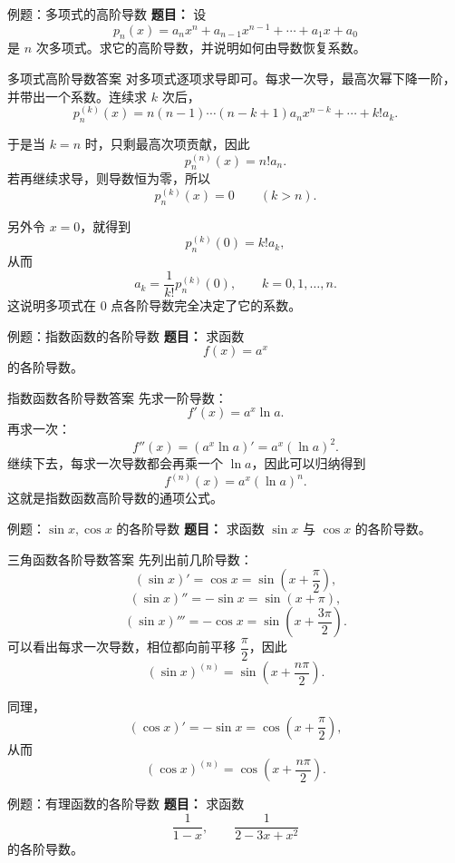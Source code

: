 ﻿\documentclass[aspectratio=169,11pt]{ctexbeamer}
\begin{document}
\begin{frame}{例题：多项式的高阶导数}
\small
\textbf{题目：} 设
\[
p_n(x)=a_nx^n+a_{n-1}x^{n-1}+\cdots+a_1x+a_0
\]
是 $n$ 次多项式。求它的高阶导数，并说明如何由导数恢复系数。
\end{frame}

\begin{frame}{多项式高阶导数答案}
\small
对多项式逐项求导即可。每求一次导，最高次幂下降一阶，并带出一个系数。连续求 $k$ 次后，
\[
p_n^{(k)}(x)
=n(n-1)\cdots(n-k+1)a_nx^{n-k}+\cdots+k!a_k.
\]

于是当 $k=n$ 时，只剩最高次项贡献，因此
\[
p_n^{(n)}(x)=n!a_n.
\]
若再继续求导，则导数恒为零，所以
\[
p_n^{(k)}(x)=0\qquad (k>n).
\]

另外令 $x=0$，就得到
\[
p_n^{(k)}(0)=k!a_k,
\]
从而
\[
a_k=\frac1{k!}p_n^{(k)}(0),\qquad k=0,1,\dots,n.
\]
这说明多项式在 $0$ 点各阶导数完全决定了它的系数。
\end{frame}

\begin{frame}{例题：指数函数的各阶导数}
\small
\textbf{题目：} 求函数
\[
f(x)=a^x
\]
的各阶导数。
\end{frame}

\begin{frame}{指数函数各阶导数答案}
\small
先求一阶导数：
\[
f'(x)=a^x\ln a.
\]
再求一次：
\[
f''(x)=(a^x\ln a)'=a^x(\ln a)^2.
\]
继续下去，每求一次导数都会再乘一个 $\ln a$，因此可以归纳得到
\[
f^{(n)}(x)=a^x(\ln a)^n.
\]
这就是指数函数高阶导数的通项公式。
\end{frame}

\begin{frame}{例题：$\sin x,\cos x$ 的各阶导数}
\small
\textbf{题目：} 求函数 $\sin x$ 与 $\cos x$ 的各阶导数。
\end{frame}

\begin{frame}{三角函数各阶导数答案}
\small
先列出前几阶导数：
\[
(\sin x)'=\cos x=\sin\left(x+\frac{\pi}{2}\right),
\]
\[
(\sin x)''=-\sin x=\sin(x+\pi),
\]
\[
(\sin x)'''=-\cos x=\sin\left(x+\frac{3\pi}{2}\right).
\]
可以看出每求一次导数，相位都向前平移 $\dfrac{\pi}{2}$，因此
\[
(\sin x)^{(n)}=\sin\left(x+\frac{n\pi}{2}\right).
\]

同理，
\[
(\cos x)'=-\sin x=\cos\left(x+\frac{\pi}{2}\right),
\]
从而
\[
(\cos x)^{(n)}=\cos\left(x+\frac{n\pi}{2}\right).
\]
\end{frame}

\begin{frame}{例题：有理函数的各阶导数}
\small
\textbf{题目：} 求函数
\[
\frac{1}{1-x},\qquad \frac{1}{2-3x+x^2}
\]
的各阶导数。
\end{frame}
\end{document}
